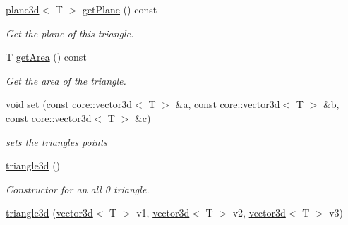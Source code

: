 \begin{DoxyCompactItemize}
\hyperlink{classirr_1_1core_1_1plane3d}{plane3d}$<$ T $>$ \hyperlink{classirr_1_1core_1_1triangle3d_a7b5460728cb47e5b2abb6d0e64b74577}{get\+Plane} () const
\begin{DoxyCompactList}\small\item\em Get the plane of this triangle. \end{DoxyCompactList}\item 
\mbox{\label{classirr_1_1core_1_1triangle3d_af8fd529a8e73b395c72507d76bf4f02d}} 
T \hyperlink{classirr_1_1core_1_1triangle3d_af8fd529a8e73b395c72507d76bf4f02d}{get\+Area} () const
\begin{DoxyCompactList}\small\item\em Get the area of the triangle. \end{DoxyCompactList}\item 
\mbox{\label{classirr_1_1core_1_1triangle3d_aebcd3f29fcbf9008dac95810c81f152c}} 
void \hyperlink{classirr_1_1core_1_1triangle3d_aebcd3f29fcbf9008dac95810c81f152c}{set} (const \hyperlink{classirr_1_1core_1_1vector3d}{core\+::vector3d}$<$ T $>$ \&a, const \hyperlink{classirr_1_1core_1_1vector3d}{core\+::vector3d}$<$ T $>$ \&b, const \hyperlink{classirr_1_1core_1_1vector3d}{core\+::vector3d}$<$ T $>$ \&c)
\begin{DoxyCompactList}\small\item\em sets the triangle\textquotesingle{}s points \end{DoxyCompactList}\item 
\mbox{\label{classirr_1_1core_1_1triangle3d_a4626559294771a8a2fb0cbbaedb6c5f9}} 
\hyperlink{classirr_1_1core_1_1triangle3d_a4626559294771a8a2fb0cbbaedb6c5f9}{triangle3d} ()
\begin{DoxyCompactList}\small\item\em Constructor for an all 0 triangle. \end{DoxyCompactList}\item 
\mbox{\label{classirr_1_1core_1_1triangle3d_a489813c59bd130d256640ba4e2745505}} 
\hyperlink{classirr_1_1core_1_1triangle3d_a489813c59bd130d256640ba4e2745505}{triangle3d} (\hyperlink{classirr_1_1core_1_1vector3d}{vector3d}$<$ T $>$ v1, \hyperlink{classirr_1_1core_1_1vector3d}{vector3d}$<$ T $>$ v2, \hyperlink{classirr_1_1core_1_1vector3d}{vector3d}$<$ T $>$ v3)

\end{DoxyCompactItemize}
